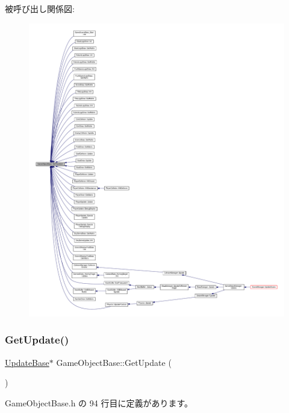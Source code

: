被呼び出し関係図\+:
\nopagebreak
\begin{figure}[H]
\begin{center}
\leavevmode
\includegraphics[width=350pt]{class_game_object_base_a7df1e16838f8fa578a27e8ba64652b49_icgraph}
\end{center}
\end{figure}
\mbox{\label{class_game_object_base_a177985be1be1252df6588fa29f2c7f41}} 
\subsubsection{\texorpdfstring{Get\+Update()}{GetUpdate()}}
{\footnotesize\ttfamily \mbox{\hyperlink{class_update_base}{Update\+Base}}$\ast$ Game\+Object\+Base\+::\+Get\+Update (\begin{DoxyParamCaption}{ }\end{DoxyParamCaption})\hspace{0.3cm}{\ttfamily [inline]}}



 Game\+Object\+Base.\+h の 94 行目に定義があります。

